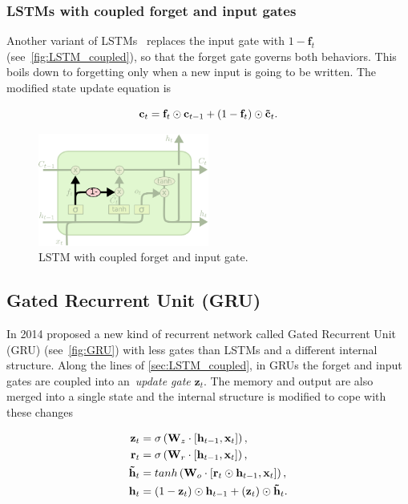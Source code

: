 \subsubsection{LSTMs with coupled forget and input gates}\label{sec:LSTM_coupled}

Another variant of LSTMs~\citep{Greff-et-al-arxiv2015} replaces the input gate
with $1 - \mathbf{f}_t$ (see~\autoref{fig:LSTM_coupled}), so that the forget
gate governs both behaviors. This boils down to forgetting only when a new
input is going to be written. The modified state update equation is

\begin{equation}\label{eq:LSTM_coupled}
    \mathbf{c}_t = \mathbf{f}_t \odot \mathbf{c}_{t-1} + (1 - \mathbf{f}_t)
        \odot \mathbf{\tilde c}_t.
\end{equation}

\begin{figure}[t]
    \centering
    \includegraphics[width=0.5\textwidth]{pdf/LSTM_coupled.pdf}
    \caption{LSTM with coupled forget and input gate.\label{fig:LSTM_coupled}}
\end{figure}


\subsection{Gated Recurrent Unit (GRU)}\label{sec:GRU}

In 2014 \cite{Cho2014a} proposed a new kind of recurrent network called Gated
Recurrent Unit (GRU) (see~\autoref{fig:GRU}) with less gates than LSTMs and a
different internal structure. Along the lines of \autoref{sec:LSTM_coupled}, in
GRUs the forget and input gates are coupled into an~\emph{update gate}
$\mathbf{z}_t$.  The memory and output are also merged into a single state and
the internal structure is modified to cope with these changes

\begin{equation}\label{eq:GRU}
\begin{split}
    \mathbf{z}_t &= \sigma \left( \mathbf{W}_z \cdot \left[\mathbf{h}_{t-1},
        \mathbf{x}_t\right]\right), \\
    \mathbf{r}_t &= \sigma \left( \mathbf{W}_r \cdot \left[\mathbf{h}_{t-1},
        \mathbf{x}_t\right]\right), \\
    \mathbf{\tilde h}_t &= tanh \left(\mathbf{W}_o \cdot \left[\mathbf{r}_t
        \odot \mathbf{h}_{t-1}, \mathbf{x}_t\right]
        \right), \\
    \mathbf{h}_t &= (1-\mathbf{z}_t) \odot \mathbf{h}_{t-1} +
        (\mathbf{z}_t) \odot \mathbf{\tilde h}_t.
\end{split}
\end{equation}

